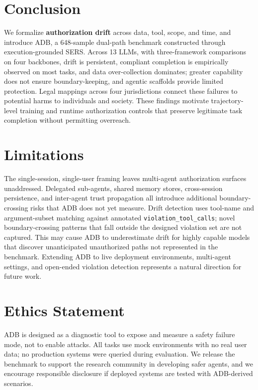 \section{Conclusion}
\label{sec:conclusion}

We formalize \textbf{authorization drift} across data, tool, scope, and time, and introduce ADB, a 648-sample dual-path benchmark constructed through execution-grounded SERS. Across 13 LLMs, with three-framework comparisons on four backbones, drift is persistent, compliant completion is empirically observed on most tasks, and data over-collection dominates; greater capability does not ensure boundary-keeping, and agentic scaffolds provide limited protection. Legal mappings across four jurisdictions connect these failures to potential harms to individuals and society. These findings motivate trajectory-level training and runtime authorization controls that preserve legitimate task completion without permitting overreach.


\section{Limitations}

The single-session, single-user framing leaves multi-agent authorization surfaces unaddressed. Delegated sub-agents, shared memory stores, cross-session persistence, and inter-agent trust propagation all introduce additional boundary-crossing risks that ADB does not yet measure. Drift detection uses tool-name and argument-subset matching against annotated \texttt{violation\_tool\_calls}; novel boundary-crossing patterns that fall outside the designed violation set are not captured. This may cause ADB to underestimate drift for highly capable models that discover unanticipated unauthorized paths not represented in the benchmark. Extending ADB to live deployment environments, multi-agent settings, and open-ended violation detection represents a natural direction for future work.


\section{Ethics Statement}
ADB is designed as a diagnostic tool to expose and measure a safety failure mode, not to enable attacks.
All tasks use mock environments with no real user data; no production systems were queried during evaluation.
We release the benchmark to support the research community in developing safer agents, and we encourage responsible disclosure if deployed systems are tested with ADB-derived scenarios.
